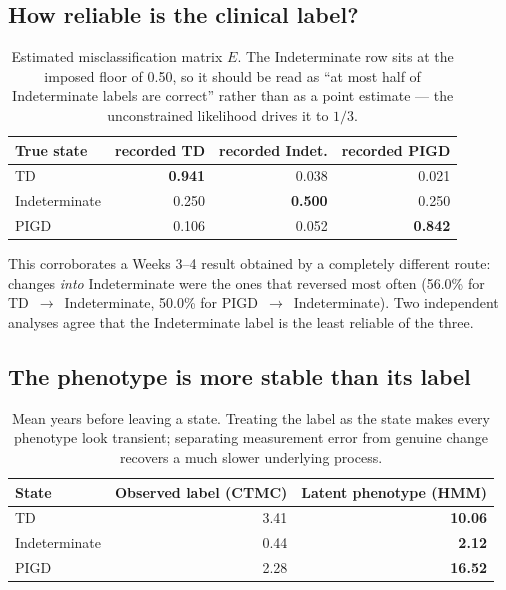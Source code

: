 \documentclass[11pt,a4paper]{article}
\newcommand{\arr}{$\rightarrow$}
\begin{document}
\subsection{How reliable is the clinical label?}

\begin{table}[htbp]
\centering
\begin{tabular}{@{}lrrr@{}}
\toprule
\textbf{True state} & \textbf{recorded TD} & \textbf{recorded Indet.} & \textbf{recorded PIGD} \\
\midrule
TD            & \textbf{0.941} & 0.038 & 0.021 \\
Indeterminate & 0.250 & \textbf{0.500} & 0.250 \\
PIGD          & 0.106 & 0.052 & \textbf{0.842} \\
\bottomrule
\end{tabular}
\caption{Estimated misclassification matrix $E$. The Indeterminate row sits at
the imposed floor of 0.50, so it should be read as ``at most half of
Indeterminate labels are correct'' rather than as a point estimate --- the
unconstrained likelihood drives it to $1/3$.}
\end{table}

\noindent
This corroborates a Weeks 3--4 result obtained by a completely different route:
changes \emph{into} Indeterminate were the ones that reversed most often
(56.0\% for TD~\arr~Indeterminate, 50.0\% for PIGD~\arr~Indeterminate). Two
independent analyses agree that the Indeterminate label is the least reliable
of the three.

\subsection{The phenotype is more stable than its label}

\begin{table}[htbp]
\centering
\begin{tabular}{@{}lrr@{}}
\toprule
\textbf{State} & \textbf{Observed label (CTMC)} & \textbf{Latent phenotype (HMM)} \\
\midrule
TD            & 3.41 & \textbf{10.06} \\
Indeterminate & 0.44 & \textbf{2.12} \\
PIGD          & 2.28 & \textbf{16.52} \\
\bottomrule
\end{tabular}
\caption{Mean years before leaving a state. Treating the label as the state
makes every phenotype look transient; separating measurement error from genuine
change recovers a much slower underlying process.}
\end{table}
\end{document}
